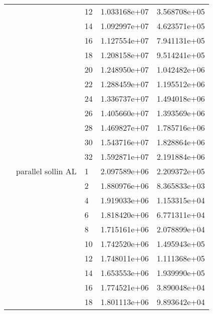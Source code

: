 \begin{tabular}{lllrr}
                      &                     & 12 &  1.033168e+07 &  3.568708e+05 \\
                      &                     & 14 &  1.092997e+07 &  4.623571e+05 \\
                      &                     & 16 &  1.127554e+07 &  7.941131e+05 \\
                      &                     & 18 &  1.208158e+07 &  9.514241e+05 \\
                      &                     & 20 &  1.248950e+07 &  1.042482e+06 \\
                      &                     & 22 &  1.288459e+07 &  1.195512e+06 \\
                      &                     & 24 &  1.336737e+07 &  1.494018e+06 \\
                      &                     & 26 &  1.405660e+07 &  1.393569e+06 \\
                      &                     & 28 &  1.469827e+07 &  1.785716e+06 \\
                      &                     & 30 &  1.543716e+07 &  1.828864e+06 \\
                      &                     & 32 &  1.592871e+07 &  2.191884e+06 \\
                      & parallel sollin AL & 1  &  2.097589e+06 &  2.209372e+05 \\
                      &                     & 2  &  1.880976e+06 &  8.365833e+03 \\
                      &                     & 4  &  1.919033e+06 &  1.153315e+04 \\
                      &                     & 6  &  1.818420e+06 &  6.771311e+04 \\
                      &                     & 8  &  1.715161e+06 &  2.078899e+04 \\
                      &                     & 10 &  1.742520e+06 &  1.495943e+05 \\
                      &                     & 12 &  1.748011e+06 &  1.111368e+05 \\
                      &                     & 14 &  1.653553e+06 &  1.939990e+05 \\
                      &                     & 16 &  1.774521e+06 &  3.890048e+04 \\
                      &                     & 18 &  1.801113e+06 &  9.893642e+04 \\

\end{tabular}
